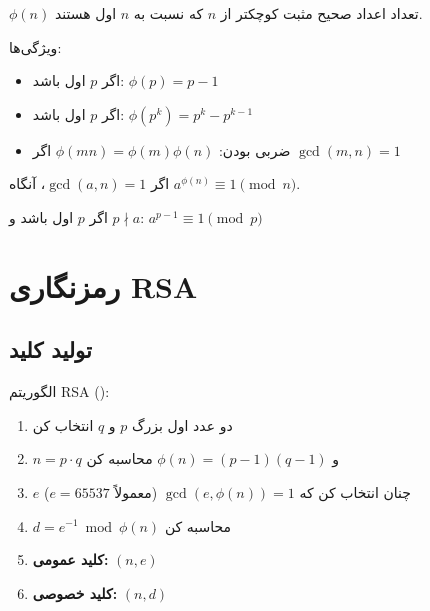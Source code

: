 \documentclass{matinbook}
\begin{document}
    \begin{definition}
        $\phi(n)$ تعداد اعداد صحیح مثبت
        کوچکتر از $n$ که نسبت به $n$ اول هستند.
        \label{def:euler-phi}
    \end{definition}
    
    ویژگی‌ها:
    \begin{itemize}
        \item اگر $p$ اول باشد: $\phi(p) = p-1$
        \item اگر $p$ اول باشد: $\phi(p^{k}) = p^{k} - p^{k-1}$
        \item ضربی بودن: $\phi(mn) = \phi(m)\phi(n)$
        اگر $\gcd(m, n) = 1$
    \end{itemize}
    
    \begin{theorem}[اویلر]
        اگر $\gcd(a, n) = 1$، آنگاه
        $a^{\phi(n)} \equiv 1 \pmod{n}$.
        \label{thm:euler}
    \end{theorem}
    
    \begin{corollary}
        اگر $p$ اول باشد و $p \nmid a$:
        $a^{p-1} \equiv 1 \pmod{p}$
        \label{cor:fermat}
    \end{corollary}
    
    \section{رمزنگاری RSA}
    
    \subsection{تولید کلید}
    
    الگوریتم RSA
    ():
    
    \begin{enumerate}
        \item دو عدد اول بزرگ $p$ و $q$ انتخاب کن
        \item $n = p \cdot q$ و
        $\phi(n) = (p-1)(q-1)$ محاسبه کن
        \item $e$ چنان انتخاب کن که
        $\gcd(e, \phi(n)) = 1$
        (معمولاً $e = 65537$)
        \item $d = e^{-1} \bmod \phi(n)$ محاسبه کن
        \item \textbf{کلید عمومی:} $(n, e)$
        \item \textbf{کلید خصوصی:} $(n, d)$
    \end{enumerate}
    
\end{document}

